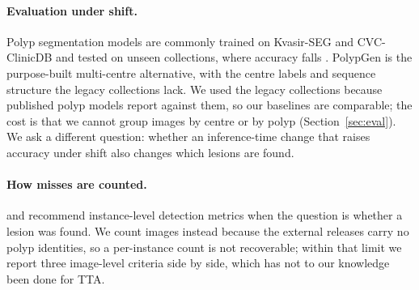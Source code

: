 \paragraph{Evaluation under shift.} Polyp segmentation models are commonly trained on Kvasir-SEG and CVC-ClinicDB and tested on unseen collections, where accuracy falls \cite{fan2020pranet}. PolypGen \cite{ali2023polypgen} is the purpose-built multi-centre alternative, with the centre labels and sequence structure the legacy collections lack. We used the legacy collections because published polyp models report against them, so our baselines are comparable; the cost is that we cannot group images by centre or by polyp (Section~\ref{sec:eval}). We ask a different question: whether an inference-time change that raises accuracy under shift also changes which lesions are found.

\paragraph{How misses are counted.} \citet{maierhein2024metrics} and \citet{reinke2024pitfalls} recommend instance-level detection metrics when the question is whether a lesion was found. We count images instead because the external releases carry no polyp identities, so a per-instance count is not recoverable; within that limit we report three image-level criteria side by side, which has not to our knowledge been done for TTA.
